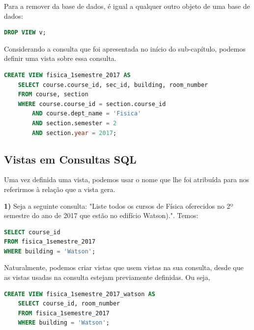 \documentclass[oneside]{book}
\theoremstyle{definition}
\begin{document}
Para a remover da base de dados, é igual a qualquer outro objeto de uma base de dados:
\begin{lstlisting}[language=SQL, morekeywords={REFERENCES, REFRESH, MATERIALIZED, CONCURRENTLY}, framesep=8pt, xleftmargin=40pt, framexleftmargin=40pt, frame=tb, framerule=0pt]
DROP VIEW v;
\end{lstlisting}

Considerando a consulta que foi apresentada no início do sub-capítulo, podemos definir uma vista sobre essa consulta.
\begin{lstlisting}[language=SQL, morekeywords={REFERENCES, REFRESH, MATERIALIZED, CONCURRENTLY}, framesep=8pt, xleftmargin=40pt, framexleftmargin=40pt, frame=tb, framerule=0pt]
CREATE VIEW fisica_1semestre_2017 AS
    SELECT course.course_id, sec_id, building, room_number
    FROM course, section
    WHERE course.course_id = section.course_id
        AND course.dept_name = 'Fisica'
        AND section.semester = 2
        AND section.year = 2017;
\end{lstlisting}

\subsection{Vistas em Consultas SQL}
Uma vez definida uma vista, podemos usar o nome que lhe foi atribuída para nos referirmos à relação que a vista gera.

\textbf{1)} Seja a seguinte consulta: "Liste todos os cursos de Física oferecidos no 2º semestre do ano de 2017 que estão no edifício Watson).". Temos:
\begin{lstlisting}[language=SQL, morekeywords={REFERENCES, REFRESH, MATERIALIZED, CONCURRENTLY}, framesep=8pt, xleftmargin=40pt, framexleftmargin=40pt, frame=tb, framerule=0pt]
SELECT course_id
FROM fisica_1semestre_2017
WHERE building = 'Watson';
\end{lstlisting}

Naturalmente, podemos criar vistas que usem vistas na sua consulta, desde que as vistas usadas na consulta estejam previamente definidas. Ou seja,
\begin{lstlisting}[language=SQL, morekeywords={REFERENCES, REFRESH, MATERIALIZED, CONCURRENTLY}, framesep=8pt, xleftmargin=40pt, framexleftmargin=40pt, frame=tb, framerule=0pt]
CREATE VIEW fisica_1semestre_2017_watson AS
    SELECT course_id, room_number
    FROM fisica_1semestre_2017
    WHERE building = 'Watson';
\end{lstlisting}
\end{document}
